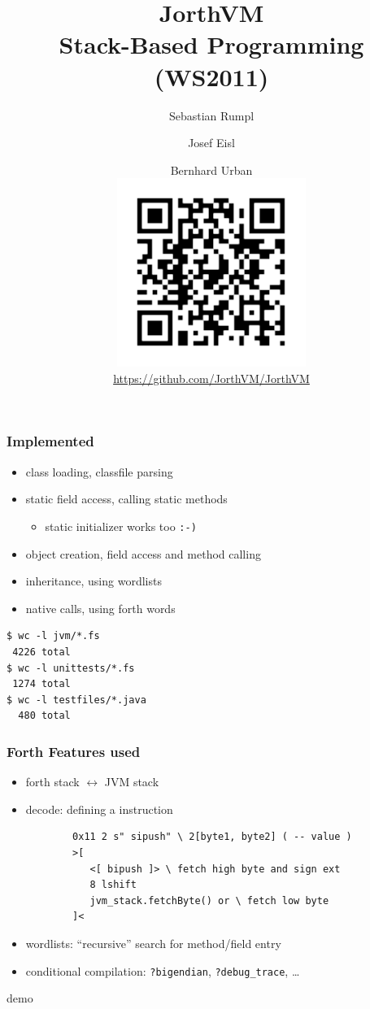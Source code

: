\documentclass{beamer}
\title{JorthVM\\\small{Stack-Based Programming (WS2011)}}
\author{Sebastian Rumpl \and Josef Eisl \and Bernhard
Urban\\\includegraphics{../github}\\\url{https://github.com/JorthVM/JorthVM}}
\begin{document}
\frame{\titlepage}
\begin{frame}[fragile]
	\frametitle{Implemented}
	\begin{itemize}
		\item class loading, classfile parsing
		\pause
		\item static field access, calling static methods
		\pause
		\begin{itemize}
			\item static initializer works too \texttt{:-)}
		\end{itemize}
		\pause
		\item object creation, field access and method calling
		\pause
		\item inheritance, using wordlists
		\pause
		\item native calls, using forth words
	\end{itemize}
	\pause
	\small
\begin{verbatim}
$ wc -l jvm/*.fs
 4226 total
$ wc -l unittests/*.fs
 1274 total
$ wc -l testfiles/*.java
  480 total
\end{verbatim}
\end{frame}

\lstset{
	basicstyle=\scriptsize
}
\begin{frame}[fragile]
	\frametitle{Forth Features used}
	
	\begin{itemize}
		\item forth stack $\leftrightarrow$ JVM stack
		\pause
		\item decode: defining a instruction
		\pause
		\begin{verbatim}
		0x11 2 s" sipush" \ 2[byte1, byte2] ( -- value )
		>[
		   <[ bipush ]> \ fetch high byte and sign ext
		   8 lshift
		   jvm_stack.fetchByte() or \ fetch low byte
		]<
		\end{verbatim}
		\pause
		\item wordlists: ``recursive'' search for method/field entry
		\pause
		\item conditional compilation: \texttt{?bigendian},
		\texttt{?debug\_trace}, \dots
	\end{itemize}
\end{frame}

\begin{frame}
	\begin{center}
		demo
	\end{center}
\end{frame}
\end{document}
